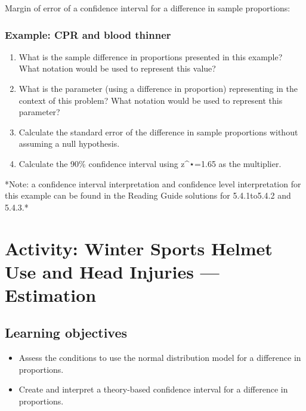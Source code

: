 \documentclass[
]{report}
\newcommand{\rgs}{\vspace{12pt}} %
\newcommand{\rgi}{\hspace{24pt}}  %
\begin{document}
Margin of error of a confidence interval for a difference in sample proportions:
\rgs

\hypertarget{example-cpr-and-blood-thinner-3}{%
\subsubsection*{Example: CPR and blood thinner}\label{example-cpr-and-blood-thinner-3}}

\begin{enumerate}
\def\labelenumi{\arabic{enumi}.}
\item
  What is the sample difference in proportions presented in this example? What notation would be used to represent this value?
  \rgs
\item
  What is the parameter (using a difference in proportion) representing in the context of this problem? What notation would be used to represent this parameter?
  \rgs
\item
  Calculate the standard error of the difference in sample proportions without assuming a null hypothesis.
  \rgs
\item
  Calculate the 90\% confidence interval using z\^{}⋆=1.65 as the multiplier.
  \rgs
\end{enumerate}

\rgi *Note: a confidence interval interpretation and confidence level interpretation for this example can be found in the Reading Guide solutions for 5.4.1to5.4.2 and 5.4.3.*

\newpage

\hypertarget{activity-winter-sports-helmet-use-and-head-injuries-estimation}{%
\section{Activity: Winter Sports Helmet Use and Head Injuries --- Estimation}\label{activity-winter-sports-helmet-use-and-head-injuries-estimation}}


\hypertarget{learning-objectives-5}{%
\subsection{Learning objectives}\label{learning-objectives-5}}

\begin{itemize}
\item
  Assess the conditions to use the normal distribution model for a difference in proportions.
\item
  Create and interpret a theory-based confidence interval for a difference in proportions.
\end{itemize}
\end{document}
